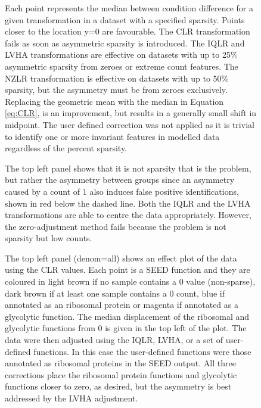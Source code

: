 \documentclass{bmcart}
\def\texttt{[image: ]}
\begin{document}
\begin{backmatter}
\begin{figure}[h!]
\caption{ Each point represents the median between condition difference for a given transformation in a dataset with a specified sparsity. Points closer to the location y=0 are favourable. The CLR transformation fails as soon as asymmetric sparsity is introduced. The IQLR and LVHA transformations are effective on datasets with up to 25\% asymmetric sparsity from zeroes or extreme count features. The NZLR transformation is effective on datasets with up to 50\% sparsity, but the asymmetry must be from zeroes exclusively. Replacing the geometric mean with the median in Equation \ref{eq:CLR}, is an improvement, but results in a generally small shift in midpoint. The user defined correction was not applied as it is trivial to identify one or more invariant features in modelled data regardless of the percent sparsity.}
\label{Fig:failure}
\end{figure}

\begin{figure}[!t]
\caption{ The top left panel shows that it is not sparsity that is the problem, but rather the asymmetry  between groups since an asymmetry caused by a count of 1 also induces false positive identifications, shown in red below the dashed line. Both the IQLR and the LVHA transformations are able to centre the data appropriately. However, the zero-adjustment method fails because the problem is not sparsity but low counts.}
\label{Fig:ones}
\end{figure}

\begin{figure}[h!]
\caption{  The top left panel (denom=all) shows an effect plot of the data using the CLR values. Each point is a SEED function \cite{Mitra:2011,Macklaim:2018aa} and they are coloured in light brown if no sample contains a 0 value (non-sparse), dark brown if at least one sample contains a 0 count, blue if annotated as an ribosomal protein or magenta if annotated as a glycolytic function. The median displacement of the ribosomal and glycolytic functions from 0 is given in the top left of the plot. The data were then adjusted using the IQLR, LVHA, or a set of user-defined functions. In this case the user-defined functions were those annotated as ribosomal proteins in the SEED output. All three corrections place the ribosomal protein functions and glycolytic functions closer to zero, as desired, but the asymmetry is best addressed by the LVHA  adjustment.  }
\label{Fig:bv}
\end{figure}


\end{backmatter}
\end{document}
